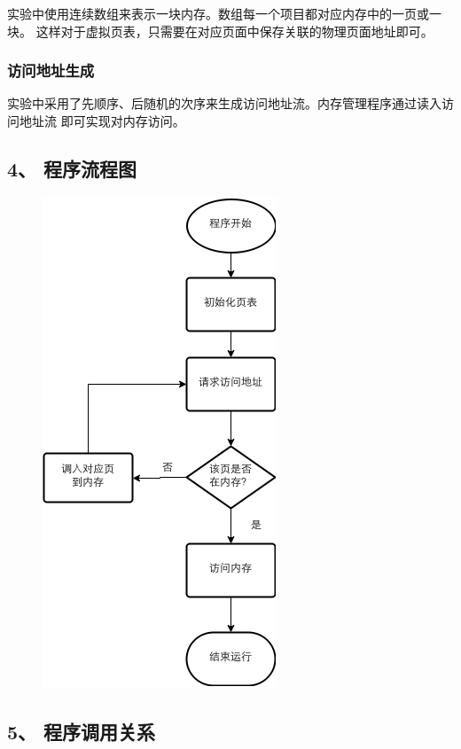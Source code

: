 \documentclass[12bp]{guo}
\begin{document}
实验中使用连续数组来表示一块内存。数组每一个项目都对应内存中的一页或一块。
这样对于虚拟页表，只需要在对应页面中保存关联的物理页面地址即可。


\subsubsection{访问地址生成}

实验中采用了先顺序、后随机的次序来生成访问地址流。内存管理程序通过读入访问地址流
即可实现对内存访问。

\clearpage

\subsection{4、 程序流程图}

\begin{figure}[h!]
    \centering
        \includegraphics[scale=0.75]{figures/3.flow.png}
\end{figure}

\subsection{5、 程序调用关系}
\end{document}
